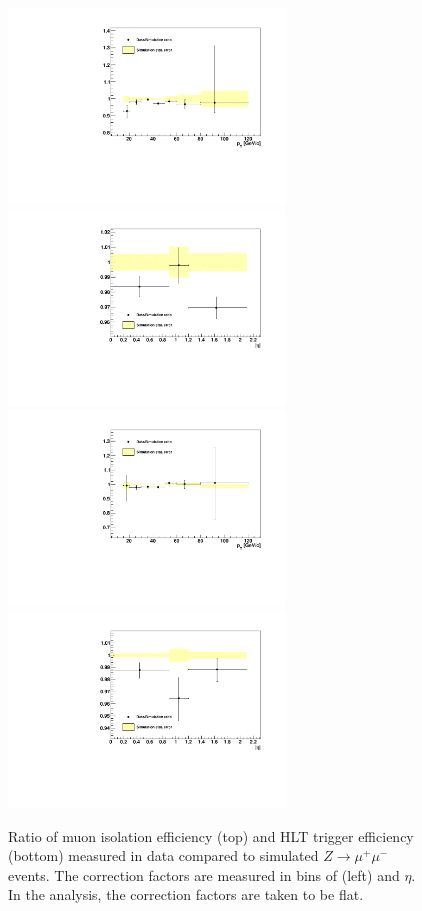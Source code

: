 \begin{figure}[t]
\begin{center}
\includegraphics*[height=52mm]{corrections_chapter/figures/pt_iso_pt_scaled.pdf}
\includegraphics*[height=52mm]{corrections_chapter/figures/etatrig_iso_abseta_scaled.pdf}
\includegraphics*[height=52mm]{corrections_chapter/figures/pt_trigCompX_pt_scaled.pdf}
\includegraphics*[height=52mm]{corrections_chapter/figures/etatrig_trigCompX_abseta_scaled.pdf}
\caption[Muon isolation correction factors]{Ratio of muon isolation efficiency
(top) and HLT trigger efficiency (bottom) 
measured in data compared to simulated $Z\rightarrow\mu^+\mu^-$ events.  The
correction factors are measured in bins of \pt (left) and $\eta$.  In the
analysis, the correction factors are taken to be flat.}
\label{fig:MuonIsoCorrVersusPt}
\end{center}
\end{figure} 

